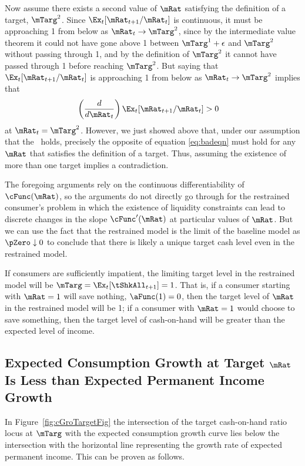 \documentclass[./BufferStockTheory.tex]{subfiles}
\begin{document}
Now assume there exists a second value of $\mRat$ satisfying the
definition of a target, $\mTarg^{2}$. Since
$\Ex_{t}[{\mRat}_{t+1}/\mRat_{t}]$ is continuous, it must be
approaching 1 from below as $\mRat_{t} \rightarrow \mTarg^{2}$, since
by the intermediate value theorem it could not have gone above 1
between $\mTarg^{1}+\epsilon$ and $\mTarg^{2}$ without passing through
1, and by the definition of $\mTarg^{2}$ it cannot have passed through
1 before reaching $\mTarg^{2}$.  But saying that
$\Ex_{t}[{\mRat}_{t+1}/\mRat_{t}]$ is approaching 1 from below as
$\mRat_{t} \rightarrow \mTarg^{2}$ implies that
\begin{align}
\left(\frac{d}{d\mRat_{t}}\right)\Ex_{t}[{\mRat}_{t+1}/\mRat_{t}]  & > 0
\label{eq:badeqn}
\end{align}
at $\mRat_{t}=\mTarg^{2}$. However, we just showed above that, under
our assumption that the \GIC~holds, precisely the opposite of equation
\eqref{eq:badeqn} must hold for any $\mRat$ that satisfies the definition
of a target. Thus, assuming the existence of more than one target
implies a contradiction.

The foregoing arguments rely on the continuous differentiability of
$\cFunc(\mRat)$, so the arguments do not directly go through for the
restrained consumer's problem in which the existence of liquidity
constraints can lead to discrete changes in the slope
$\cFunc^{\prime}(\mRat)$ at particular values of $\mRat$. But we can
use the fact that the restrained model is the limit of the baseline
model as $\pZero \downarrow 0$ to conclude that there is likely a
unique target cash level even in the restrained model.

If consumers are sufficiently impatient, the limiting target level in the
restrained model will be $\mTarg = \Ex_{t}[{\tShkAll}_{t+1}] = 1$. That
is, if a consumer starting with $\mRat = 1$ will save nothing, ${\aFunc}(1)=0$,
then the target level of $\mRat$ in the restrained model will be 1; if a
consumer with $\mRat=1$ would choose to save something, then the target
level of cash-on-hand will be greater than the expected level of income.

\hypertarget{cGroLTpGro}{}
\subsection{Expected Consumption Growth at Target $\mRat$ Is Less than
Expected Permanent Income Growth}

\label{subsec:expcgrowth} In Figure~\ref{fig:cGroTargetFig} the intersection of
the target cash-on-hand ratio locus at $\mTarg$ with the expected consumption
growth curve lies below the intersection with the horizontal line
representing the growth rate of expected permanent income. This can be
proven as follows.
\end{document}
